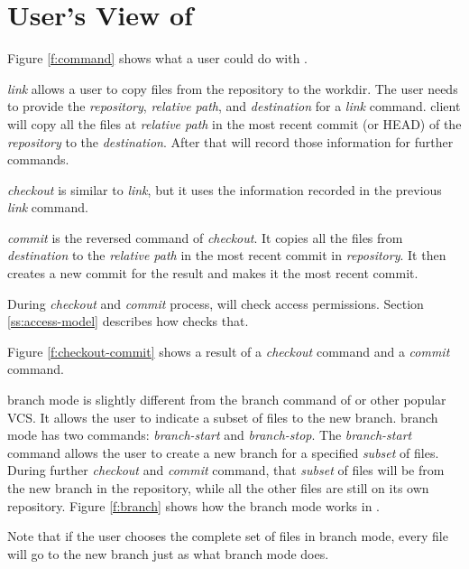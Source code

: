 \section{User's View of \Sys}
\label{userview}

\iffalse
    * Describe what action a user could make. Write a table for all the actions.
    * Describe the functionality for each important action which can not be
      described completely in the table.
    * Mention how each action is related to the FVM Daemon, if needed. (probably
      not needed)
\fi







Figure \ref{f:command} shows what a user could do with \sys.

\emph{link} allows a user to copy files from the repository to the workdir.
The user needs to provide the \emph{repository}, \emph{relative path}, and
\emph{destination} for a \emph{link} command. \Sys client will copy all the files
at \emph{relative path} in the most recent commit (or HEAD) of the
\emph{repository} to the \emph{destination}. After that \sys will record those
information for further commands.

\emph{checkout} is similar to \emph{link}, but it uses the information recorded
in the previous \emph{link} command.

\emph{commit} is the reversed command of \emph{checkout}. It
copies all the files from \emph{destination} to the \emph{relative path} in the
most recent commit in \emph{repository}. It then creates a new commit for the
result and makes it the most recent commit.

During \emph{checkout} and \emph{commit} process, \sys will check access
permissions. Section \ref{ss:access-model} describes how \sys checks that.

Figure \ref{f:checkout-commit} shows a result of a \emph{checkout} command and
a \emph{commit} command.

\Sys branch mode is slightly different from the branch command of \git or other
popular VCS. It allows the user to indicate a subset of files to the new branch.
\Sys branch mode has two commands: \emph{branch-start} and \emph{branch-stop}.
The \emph{branch-start} command allows the user to create a new branch for a
specified \emph{subset} of files. During further \emph{checkout} and \emph{commit}
command, that \emph{subset} of files will be from the new branch in the
repository, while all the other files are still on its own repository. Figure
\ref{f:branch} shows how the branch mode works in \sys.

Note that if the user chooses the complete set of files in branch mode, every
file will go to the new branch just as what \git branch mode does.


